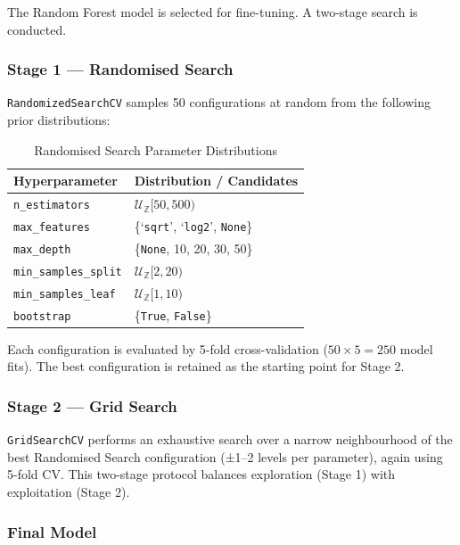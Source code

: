 \documentclass[conference]{IEEEtran}
\begin{document}
The Random Forest model is selected for fine-tuning. A two-stage search is conducted.

\subsubsection{Stage 1 — Randomised Search}

\texttt{RandomizedSearchCV} samples 50 configurations at random from the following prior distributions:

\begin{table}[H]
\centering
\caption{Randomised Search Parameter Distributions}
\label{tab:rand_search}
\begin{tabular}{@{}ll@{}}
\toprule
\textbf{Hyperparameter} & \textbf{Distribution / Candidates} \\
\midrule
\texttt{n\_estimators}      & $\mathcal{U}_\mathbb{Z}[50, 500)$ \\
\texttt{max\_features}      & \{`\texttt{sqrt}', `\texttt{log2}', \texttt{None}\} \\
\texttt{max\_depth}         & \{\texttt{None}, 10, 20, 30, 50\} \\
\texttt{min\_samples\_split}& $\mathcal{U}_\mathbb{Z}[2, 20)$ \\
\texttt{min\_samples\_leaf} & $\mathcal{U}_\mathbb{Z}[1, 10)$ \\
\texttt{bootstrap}          & \{\texttt{True}, \texttt{False}\} \\
\bottomrule
\end{tabular}
\end{table}

Each configuration is evaluated by 5-fold cross-validation ($50 \times 5 = 250$ model fits). The best configuration is retained as the starting point for Stage 2.

\subsubsection{Stage 2 — Grid Search}

\texttt{GridSearchCV} performs an exhaustive search over a narrow neighbourhood of the best Randomised Search configuration (±1–2 levels per parameter), again using 5-fold CV. This two-stage protocol balances exploration (Stage 1) with exploitation (Stage 2).

\subsubsection{Final Model}
\end{document}
